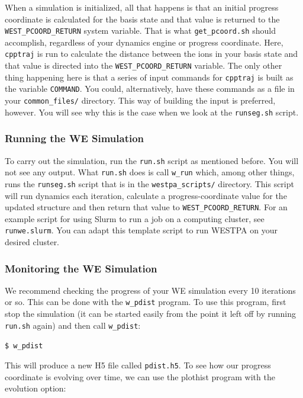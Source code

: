 \documentclass[9pt,tutorial]{livecoms}
\begin{document}
When a simulation is initialized, all that happens is that an initial progress coordinate is calculated for the basis state and that value is returned to the \verb|WEST_PCOORD_RETURN| system variable. 
That is what \verb|get_pcoord.sh| should accomplish, regardless of your dynamics engine or progress coordinate. Here, \verb|cpptraj| is run to calculate the distance between the ions in your basis state and that value is directed into the \verb|WEST_PCOORD_RETURN| variable. 
The only other thing happening here is that a series of input commands for \verb|cpptraj| is built as the variable \verb|COMMAND|.  
You could, alternatively, have these commands as a file in your \verb|common_files/| directory. 
This way of building the input is preferred, however. 
You will see why this is the case when we look at the \verb|runseg.sh| script.

\subsubsection{Running the WE Simulation}

To carry out the simulation, run the \verb|run.sh| script as mentioned before. 
You will not see any output. What \verb|run.sh| does is call \verb|w_run| which, among other things, runs the \verb|runseg.sh| script that is in the \verb|westpa_scripts/| directory. 
This script will run dynamics each iteration, calculate a progress-coordinate value for the updated structure and then return that value to \verb|WEST_PCOORD_RETURN|. 
For an example script for using Slurm to run a job on a computing cluster, see \verb|runwe.slurm|. 
You can adapt this template script to run WESTPA on your desired cluster.  

\subsubsection{Monitoring the WE Simulation}

We recommend checking the progress of your WE simulation every 10 iterations or so. 
This can be done with the \verb|w_pdist| program. To use this program, first stop the simulation (it can be started easily from the point it left off by running \verb|run.sh| again) and then call \verb|w_pdist|:
 
\verb|$ w_pdist|
 
This will produce a new H5 file called \verb|pdist.h5|. 
To see how our progress coordinate is evolving over time, we can use the plothist program with the evolution option:
 
\end{document}
